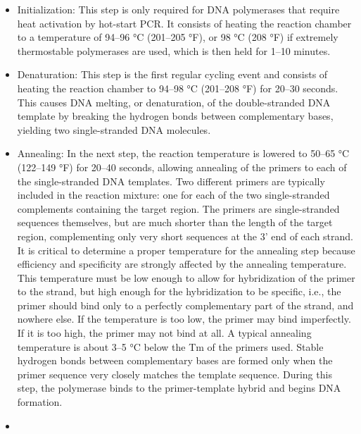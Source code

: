\begin{itemize}
\tightlist
\item
  Initialization: This step is only required for DNA polymerases that require heat activation by hot-start PCR. It consists of heating the reaction chamber to a temperature of 94--96 °C (201--205 °F), or 98 °C (208 °F) if extremely thermostable polymerases are used, which is then held for 1--10 minutes.
\item
  Denaturation: This step is the first regular cycling event and consists of heating the reaction chamber to 94--98 °C (201--208 °F) for 20--30 seconds. This causes DNA melting, or denaturation, of the double-stranded DNA template by breaking the hydrogen bonds between complementary bases, yielding two single-stranded DNA molecules.
\item
  Annealing: In the next step, the reaction temperature is lowered to 50--65 °C (122--149 °F) for 20--40 seconds, allowing annealing of the primers to each of the single-stranded DNA templates. Two different primers are typically included in the reaction mixture: one for each of the two single-stranded complements containing the target region. The primers are single-stranded sequences themselves, but are much shorter than the length of the target region, complementing only very short sequences at the 3' end of each strand.
  It is critical to determine a proper temperature for the annealing step because efficiency and specificity are strongly affected by the annealing temperature. This temperature must be low enough to allow for hybridization of the primer to the strand, but high enough for the hybridization to be specific, i.e., the primer should bind only to a perfectly complementary part of the strand, and nowhere else. If the temperature is too low, the primer may bind imperfectly. If it is too high, the primer may not bind at all. A typical annealing temperature is about 3--5 °C below the Tm of the primers used. Stable hydrogen bonds between complementary bases are formed only when the primer sequence very closely matches the template sequence. During this step, the polymerase binds to the primer-template hybrid and begins DNA formation.
\item

\end{itemize}
